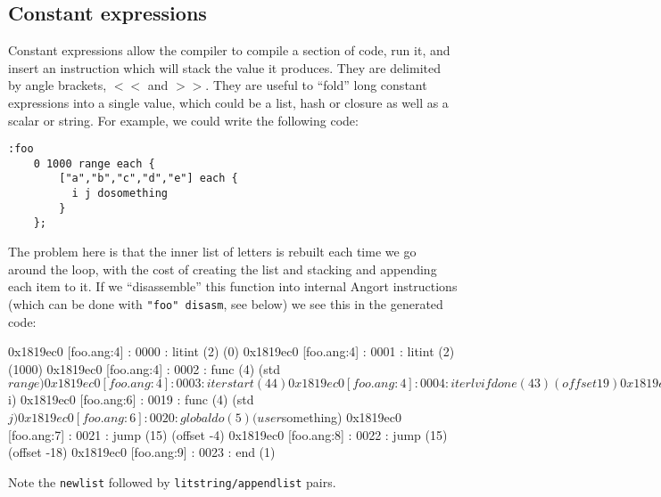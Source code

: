 \subsection{Constant expressions}
Constant expressions allow the compiler to compile a section of code,
run it, and insert an instruction which will stack the value it produces.
They are delimited by angle brackets, $<<$ and $>>$.
They are useful to ``fold'' long constant expressions into a single value,
which could be a list, hash or closure as well as a scalar or string.
For example, we could write the following code:
\begin{lstlisting}
:foo
    0 1000 range each {
        ["a","b","c","d","e"] each {
          i j dosomething
        }
    };
\end{lstlisting}
The problem here is that the inner list of letters is rebuilt
each time we go around the loop, with the cost of creating the list
and stacking and appending each item to it. If we ``disassemble'' this function
into internal Angort instructions
(which can be done with \texttt{"foo" disasm}, see below) we see this in the generated
code:
\begin{v}
     0x1819ec0 [foo.ang:4] : 0000 : litint (2) (0)
     0x1819ec0 [foo.ang:4] : 0001 : litint (2) (1000)
     0x1819ec0 [foo.ang:4] : 0002 : func (4)  (std$range)
     0x1819ec0 [foo.ang:4] : 0003 : iterstart (44) 
     0x1819ec0 [foo.ang:4] : 0004 : iterlvifdone (43) (offset 19)
     0x1819ec0 [foo.ang:5] : 0005 : newlist (47) 
     0x1819ec0 [foo.ang:5] : 0006 : litstring (18) (a)
     0x1819ec0 [foo.ang:5] : 0007 : appendlist (48) 
     0x1819ec0 [foo.ang:5] : 0008 : litstring (18) (b)
     0x1819ec0 [foo.ang:5] : 0009 : appendlist (48) 
     0x1819ec0 [foo.ang:5] : 0010 : litstring (18) (c)
     0x1819ec0 [foo.ang:5] : 0011 : appendlist (48) 
     0x1819ec0 [foo.ang:5] : 0012 : litstring (18) (d)
     0x1819ec0 [foo.ang:5] : 0013 : appendlist (48) 
     0x1819ec0 [foo.ang:5] : 0014 : litstring (18) (e)
     0x1819ec0 [foo.ang:5] : 0015 : appendlist (48) 
     0x1819ec0 [foo.ang:5] : 0016 : iterstart (44) 
     0x1819ec0 [foo.ang:5] : 0017 : iterlvifdone (43) (offset 5)
     0x1819ec0 [foo.ang:6] : 0018 : func (4)  (std$i)
     0x1819ec0 [foo.ang:6] : 0019 : func (4)  (std$j)
     0x1819ec0 [foo.ang:6] : 0020 : globaldo (5) (user$something)
     0x1819ec0 [foo.ang:7] : 0021 : jump (15) (offset -4)
     0x1819ec0 [foo.ang:8] : 0022 : jump (15) (offset -18)
     0x1819ec0 [foo.ang:9] : 0023 : end (1) 
\end{v}
Note the \texttt{newlist} followed by \texttt{litstring/appendlist} pairs.
